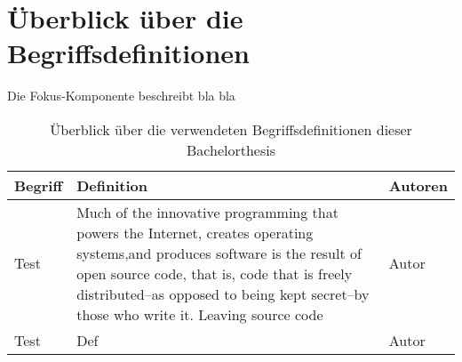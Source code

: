 \clearpage
\chapter*{Überblick über die Begriffsdefinitionen} \label{kap:def}
Die Fokus-Komponente beschreibt bla bla

\begin{table*}[h!]
	\centering
	
	\begin{tabular}{@{}lp{6.5cm}l@{}}\toprule[1.5pt]
		
		\textbf{Begriff} & \textbf{Definition} & \textbf{Autoren} \\ \midrule
		Test     & Much of the innovative programming that powers the Internet, creates operating systems,and produces software is the result of open source code, that is, code that is freely distributed--as opposed to being kept secret--by those who write it. Leaving source code  & Autor           \\
				
		Test                      & Def                 & Autor           \\
		
	\bottomrule[1.5pt]
	\end{tabular}

	\caption{Überblick über die verwendeten Begriffsdefinitionen dieser Bachelorthesis}
	\label{tab:definitionen}

\end{table*}